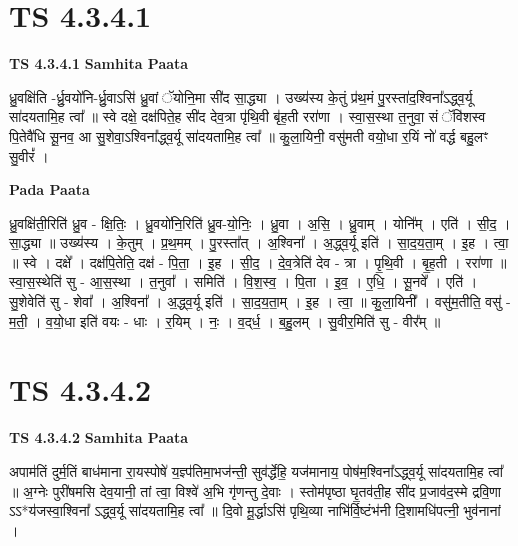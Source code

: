 \documentclass[17pt]{extarticle}
\begin{document}

\section{ TS 4.3.4.1 }

\textbf{TS 4.3.4.1 } \newline
\textbf{Samhita Paata} \newline

ध्रु॒वक्षि॑ति -र्ध्रु॒वयो॑नि-र्ध्रु॒वाऽसि॑ ध्रु॒वां ॅयोनि॒मा सी॑द सा॒द्ध्या । उख्य॑स्य के॒तुं प्र॑थ॒मं पु॒रस्ता॑द॒श्विना᳚ऽद्ध्व॒र्यू सा॑दयतामि॒ह त्वा᳚ ॥ स्वे दक्षे॒ दक्ष॑पिते॒ह सी॑द देव॒त्रा पृ॑थि॒वी बृ॑ह॒ती ररा॑णा । स्वा॒स॒स्था त॒नुवा॒ सं ॅवि॑शस्व पि॒तेवै॑धि सू॒नव॒ आ सु॒शेवा॒ऽश्विना᳚द्ध्व॒र्यू सा॑दयतामि॒ह त्वा᳚ ॥ कु॒ला॒यिनी॒ वसु॑मती वयो॒धा र॒यिं नो॑ वर्द्ध बहु॒लꣳ सु॒वीरं᳚ । \newline

\textbf{Pada Paata} \newline

ध्रु॒वक्षि॑ती॒रिति॑ ध्रु॒व - क्षि॒तिः॒ । ध्रु॒वयो॑नि॒रिति॑ ध्रु॒व-यो॒निः॒ । ध्रु॒वा । अ॒सि॒ । ध्रु॒वाम् । योनि᳚म् । एति॑ । सी॒द॒ । सा॒द्ध्या ॥ उख्य॑स्य । के॒तुम् । प्र॒थ॒मम् । पु॒रस्ता᳚त् । अ॒श्विना᳚ । अ॒द्ध्व॒र्यू इति॑ । सा॒द॒य॒ता॒म् । इ॒ह । त्वा॒ ॥ स्वे । दक्षे᳚ । दक्ष॑पि॒तेति॒ दक्ष॑ - पि॒ता॒ । इ॒ह । सी॒द॒ । दे॒व॒त्रेति॑ देव - त्रा । पृ॒थि॒वी । बृ॒ह॒ती । ररा॑णा ॥ स्वा॒स॒स्थेति॑ सु - आ॒स॒स्था । त॒नुवा᳚ । समिति॑ । वि॒श॒स्व॒ । पि॒ता । इ॒व॒ । ए॒धि॒ । सू॒नवे᳚ । एति॑ । सु॒शेवेति॑ सु - शेवा᳚ । अ॒श्विना᳚ । अ॒द्ध्व॒र्यू इति॑ । सा॒द॒य॒ता॒म् । इ॒ह । त्वा॒ ॥ कु॒ला॒यिनी᳚ । वसु॑म॒तीति॒ वसु॑ - म॒ती॒ । व॒यो॒धा इति॑ वयः - धाः । र॒यिम् । नः॒ । व॒द्‌र्ध॒ । ब॒हु॒लम् । सु॒वीर॒मिति॑ सु - वीर᳚म् ॥  \newline





\section{ TS 4.3.4.2 }

\textbf{TS 4.3.4.2 } \newline
\textbf{Samhita Paata} \newline

अपाम॑तिं दुर्म॒तिं बाध॑माना रा॒यस्पोषे॑ य॒ज्ञ्प॑तिमा॒भज॑न्ती॒ सुव॑र्द्धेहि॒ यज॑मानाय॒ पोष॑म॒श्विना᳚ऽद्ध्व॒र्यू सा॑दयतामि॒ह त्वा᳚ ॥ अ॒ग्नेः पुरी॑षमसि देव॒यानी॒ तां त्वा॒ विश्वे॑ अ॒भि गृ॑णन्तु दे॒वाः । स्तोम॑पृष्ठा घृ॒तव॑ती॒ह सी॑द प्र॒जाव॑द॒स्मे द्रवि॒णा ऽऽ*य॑जस्वा॒श्विना᳚ ऽद्ध्व॒र्यू सा॑दयतामि॒ह त्वा᳚ ॥ दि॒वो मू॒र्द्धाऽसि॑ पृथि॒व्या नाभि॑र्वि॒ष्टंभ॑नी दि॒शामधि॑पत्नी॒ भुव॑नानां । \newline
\end{document}

